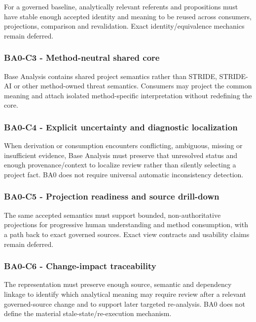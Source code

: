 \documentclass[
  10pt,
]{article}
\begin{document}
For a governed baseline, analytically relevant referents and
propositions must have stable enough accepted identity and meaning to be
reused across consumers, projections, comparison and revalidation. Exact
identity/equivalence mechanics remain deferred.

\subsubsection{BA0-C3 - Method-neutral shared
core}\label{ba0-c3---method-neutral-shared-core}

Base Analysis contains shared project semantics rather than STRIDE,
STRIDE-AI or other method-owned threat semantics. Consumers may project
the common meaning and attach isolated method-specific interpretation
without redefining the core.

\subsubsection{BA0-C4 - Explicit uncertainty and diagnostic
localization}\label{ba0-c4---explicit-uncertainty-and-diagnostic-localization}

When derivation or consumption encounters conflicting, ambiguous,
missing or insufficient evidence, Base Analysis must preserve that
unresolved status and enough provenance/context to localize review
rather than silently selecting a project fact. BA0 does not require
universal automatic inconsistency detection.

\subsubsection{BA0-C5 - Projection readiness and source
drill-down}\label{ba0-c5---projection-readiness-and-source-drill-down}

The same accepted semantics must support bounded, non-authoritative
projections for progressive human understanding and method consumption,
with a path back to exact governed sources. Exact view contracts and
usability claims remain deferred.

\subsubsection{BA0-C6 - Change-impact
traceability}\label{ba0-c6---change-impact-traceability}

The representation must preserve enough source, semantic and dependency
linkage to identify which analytical meaning may require review after a
relevant governed-source change and to support later targeted
re-analysis. BA0 does not define the material stale-state/re-execution
mechanism.
\end{document}

